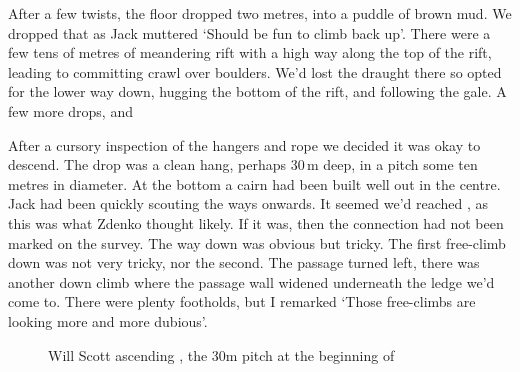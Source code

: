 After a few twists, the floor dropped two metres, into a puddle of brown mud. We dropped that as Jack muttered `Should be fun to climb back up'. There were a few tens of metres of meandering rift with a high way along the top of the rift, leading to committing crawl over boulders. We'd lost the draught there so opted for the lower way down, hugging the bottom of the rift, and following the gale. A few more drops, and 

After a cursory inspection of the hangers and rope we decided it was okay to descend. The drop was a clean hang, perhaps 30\,m deep, in a pitch some ten metres in diameter. At the bottom a cairn had been built well out in the centre. Jack had been quickly scouting the ways onwards. It seemed we'd reached , as this was what Zdenko thought likely. If it was, then the connection had not been marked on the survey. The way down was obvious but tricky. The first free-climb down was not very tricky, nor the second. The passage turned left, there was another down climb where the passage wall widened underneath the ledge we'd come to. There were plenty footholds, but I remarked `Those free-climbs are looking more and more dubious'. 

\begin{figure}[t!]
\centering
{}
\caption{Will Scott ascending \protect{}, the 30m pitch at the beginning of \protect{} }
\label{Rokovobrezno}
\end{figure}

